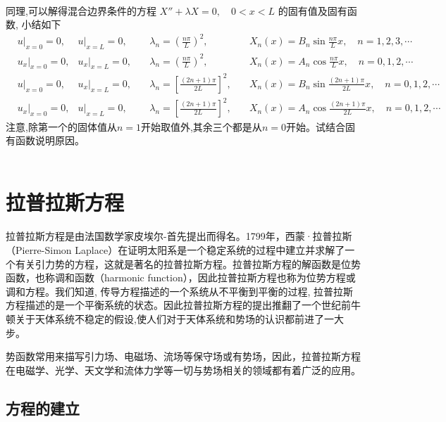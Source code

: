 ~~\\
同理,可以解得混合边界条件的方程 $X'' + \lambda X =0, \quad 0<x<L$ 的固有值及固有函数, 小结如下\\
$$
\begin{aligned}
	&\left.u\right|_{x=0}=0,& \left.u\right|_{x=L}=0,\quad & \lambda_n=\left(\frac{n \pi}{L}\right)^2, \quad & X_n(x)=B_n \sin \frac{n \pi}{L} x, \quad n=1,2,3, \cdots \\
	&\left.u_x\right|_{x=0}=0,&\left.u_x\right|_{x=L}=0,\quad & \lambda_n=\left(\frac{n \pi}{L}\right)^2, \quad & X_n(x)=A_n \cos \frac{n \pi}{L} x,\quad n=0,1,2, \cdots \\
	&\left.u\right|_{x=0}=0,&\left. u_x\right|_{x=L}=0,\quad & \lambda_n=\left[\frac{(2 n+1) \pi}{2 L}\right]^2, \quad & X_n(x)=B_n \sin \frac{(2 n+1) \pi}{2 L} x, \quad n=0,1,2, \cdots \\
	&\left.u_x\right|_{x=0}=0,& \left. u\right|_{x=L}=0,\quad & \lambda_n=\left[\frac{(2 n+1) \pi}{2 L}\right]^2, \quad & X_n(x)=A_n \cos \frac{(2 n+1) \pi}{2 L} x,\quad n=0,1,2, \cdots
\end{aligned}
$$
注意,除第一个的固体值从$n=1$开始取值外,其余三个都是从$n=0$开始。试结合固有函数说明原因。
~~\\ 
~~\\ 

\section{拉普拉斯方程}

拉普拉斯方程是由法国数学家皮埃尔-首先提出而得名。1799年，西蒙·拉普拉斯（Pierre-Simon Laplace）在证明太阳系是一个稳定系统的过程中建立并求解了一个有关引力势的方程，这就是著名的拉普拉斯方程。拉普拉斯方程的解函数是位势函数，也称调和函数（harmonic function），因此拉普拉斯方程也称为位势方程或调和方程。我们知道, 传导方程描述的一个系统从不平衡到平衡的过程, 拉普拉斯方程描述的是一个平衡系统的状态。因此拉普拉斯方程的提出推翻了一个世纪前牛顿关于天体系统不稳定的假设,使人们对于天体系统和势场的认识都前进了一大步。

势函数常用来描写引力场、电磁场、流场等保守场或有势场，因此，拉普拉斯方程在电磁学、光学、天文学和流体力学等一切与势场相关的领域都有着广泛的应用。

\subsection{方程的建立}

